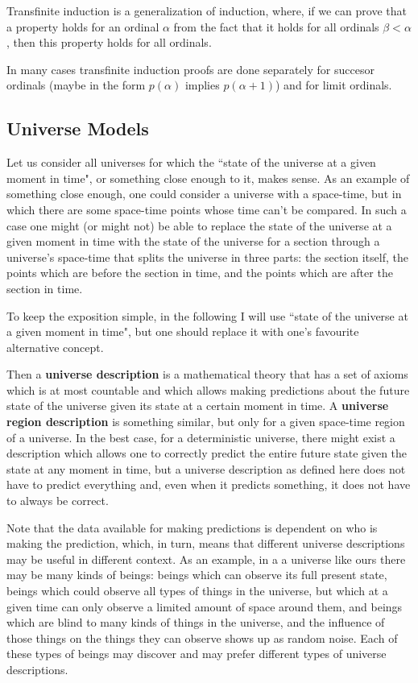 \documentclass[a4paper
,draft
]{article}
\newcommand{\definitie}[1]{\textbf{#1}}
\newcommand{\ghilimele}[1]{``#1"}
\begin{document}
Transfinite induction is a generalization of induction, where, if we can
prove that a property holds for an ordinal $\alpha$ from the fact that
it holds for all ordinals $\beta<\alpha$, then this property holds for
all ordinals.

In many cases transfinite induction proofs are done separately for
succesor ordinals (maybe in the form $p(\alpha)$ implies $p(\alpha+1)$)
and for limit ordinals.

\subsection{Universe Models}

Let us consider all universes for which the
\ghilimele{state of the universe at a given moment in time},
or something close enough to it, makes sense. As an example of something
close enough, one could consider a universe with a space-time,
but in which there are some space-time points whose time can't be compared.
In such a case one might (or might not) be able to replace the state of
the universe at a given moment in time with the state of the universe
for a section through a universe's space-time that splits the universe
in three parts: the section itself, the points which are before the
section in time, and the points which are after the section in time.

To keep the exposition simple, in the following I will use
\ghilimele{state of the universe at a given moment in time},
but one should replace it with one's favourite alternative concept.

Then a \definitie{universe description} is a mathematical theory that has
a set of axioms which is at most countable and which allows making
predictions about the future state of the universe given its state
at a certain moment in time. A \definitie{universe region description}
is something similar, but only for a given space-time region of a universe.
In the best case, for a deterministic universe, there might exist
a description which allows one to correctly predict the entire future state
given the state at any moment in time, but a universe description
as defined here does not have to predict everything and,
even when it predicts something, it does not have to always be correct.

Note that the data available for making predictions is dependent
on who is making the prediction, which, in turn, means that
different universe descriptions may be useful in different context.
As an example, in a a universe like ours there may be many
kinds of beings: beings which can observe its full present state,
beings which could observe all types of things in the universe,
but which at a given time can only observe a limited amount of
space around them, and beings which are blind to many kinds of
things in the universe, and the influence of those things on the things
they can observe shows up as random noise. Each of these types of beings
may discover and may prefer different types of universe descriptions.
\end{document}
